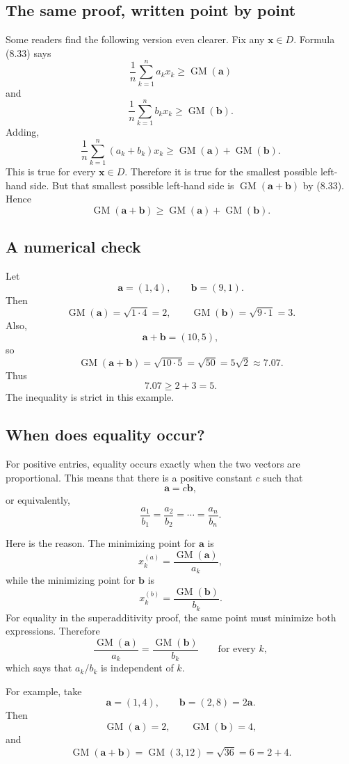 \documentclass[11pt]{article}
\newcommand{\GM}{\operatorname{GM}}
\begin{document}
\subsection{The same proof, written point by point}

Some readers find the following version even clearer.  Fix any
$\mathbf x\in D$.  Formula (8.33) says
\[
 \frac1n\sum_{k=1}^{n}a_kx_k\ge\GM(\mathbf a)
\]
and
\[
 \frac1n\sum_{k=1}^{n}b_kx_k\ge\GM(\mathbf b).
\]
Adding,
\[
 \frac1n\sum_{k=1}^{n}(a_k+b_k)x_k
 \ge
 \GM(\mathbf a)+\GM(\mathbf b).
\]
This is true for every $\mathbf x\in D$.  Therefore it is true for the
smallest possible left-hand side.  But that smallest possible left-hand side is
$\GM(\mathbf a+\mathbf b)$ by (8.33).  Hence
\[
 \GM(\mathbf a+\mathbf b)
 \ge
 \GM(\mathbf a)+\GM(\mathbf b).
\]

\subsection{A numerical check}

Let
\[
 \mathbf a=(1,4),
 \qquad
 \mathbf b=(9,1).
\]
Then
\[
 \GM(\mathbf a)=\sqrt{1\cdot4}=2,
 \qquad
 \GM(\mathbf b)=\sqrt{9\cdot1}=3.
\]
Also,
\[
 \mathbf a+\mathbf b=(10,5),
\]
so
\[
 \GM(\mathbf a+\mathbf b)
 =\sqrt{10\cdot5}
 =\sqrt{50}
 =5\sqrt2
 \approx7.07.
\]
Thus
\[
 7.07\ge2+3=5.
\]
The inequality is strict in this example.

\subsection{When does equality occur?}

For positive entries, equality occurs exactly when the two vectors are
proportional.  This means that there is a positive constant $c$ such that
\[
 \mathbf a=c\mathbf b,
\]
or equivalently,
\[
 \frac{a_1}{b_1}
 =\frac{a_2}{b_2}
 =\cdots
 =\frac{a_n}{b_n}.
\]

Here is the reason.  The minimizing point for $\mathbf a$ is
\[
 x_k^{(a)}=\frac{\GM(\mathbf a)}{a_k},
\]
while the minimizing point for $\mathbf b$ is
\[
 x_k^{(b)}=\frac{\GM(\mathbf b)}{b_k}.
\]
For equality in the superadditivity proof, the same point must minimize both
expressions.  Therefore
\[
 \frac{\GM(\mathbf a)}{a_k}
 =\frac{\GM(\mathbf b)}{b_k}
 \qquad\text{for every }k,
\]
which says that $a_k/b_k$ is independent of $k$.

For example, take
\[
 \mathbf a=(1,4),
 \qquad
 \mathbf b=(2,8)=2\mathbf a.
\]
Then
\[
 \GM(\mathbf a)=2,
 \qquad
 \GM(\mathbf b)=4,
\]
and
\[
 \GM(\mathbf a+\mathbf b)
 =\GM(3,12)
 =\sqrt{36}=6=2+4.
\]
\end{document}
